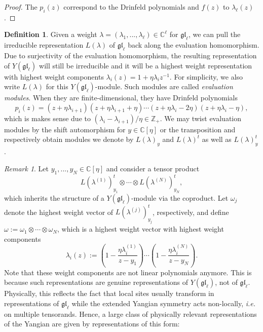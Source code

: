 \documentclass[11pt]{report}
\theoremstyle{definition}
\newtheorem{definition}[theorem]{Definition}
\theoremstyle{remark}
\newtheorem*{remark}{Remark}
\theoremstyle{remark}
\newcommand{\Z}{\mathbb{Z}}
\newcommand{\C}{\mathbb{C}}
\begin{document}
\begin{proof}
The $p_i(z)$ correspond to the Drinfeld polynomials and $f(z)$ to $\lambda_\ell(z)$.
\end{proof}

\begin{definition}
Given a weight $\lambda = (\lambda_1,...,\lambda_\ell) \in \C^\ell$ for $\mathfrak{gl}_\ell$, we can pull the irreducible representation $L(\lambda)$ of $\mathfrak{gl}_\ell$ back along the evaluation homomorphism. Due to surjectivity of the evaluation homomorphism, the resulting representation of $Y(\mathfrak{gl}_\ell)$ will still be irreducible and it will be a highest weight representation with highest weight components $\lambda_i(z) = 1 + \eta \lambda_i z^{-1}$. For simplicity, we also write $L(\lambda)$ for this $Y(\mathfrak{gl}_\ell)$-module. Such modules are called \emph{evaluation modules}. When they are finite-dimensional, they have Drinfeld polynomials
\begin{equation*}
p_i(z) = (z+\eta \lambda_{i+1})(z+\eta \lambda_{i+1}+\eta) \cdots (z+\eta \lambda_i-2\eta)(z+\eta \lambda_i-\eta),
\end{equation*}
which is makes sense due to $(\lambda_i - \lambda_{i+1})/\eta \in \Z_+$. We may twist evaluation modules by the shift automorphism for $y \in \C[\eta]$ or the transposition and respectively obtain modules we denote by $L(\lambda)_y$ and $L(\lambda)^t$ as well as $L(\lambda)_y^t$.
\end{definition}

\begin{remark}
Let $y_1,...,y_N \in \C[\eta]$ and consider a tensor product
\begin{equation*}
L(\lambda^{(1)})_{y_1}^t \otimes \cdots \otimes L(\lambda^{(N)})_{y_N}^t,
\end{equation*}
which inherits the structure of a $Y(\mathfrak{gl}_\ell)$-module via the coproduct. Let $\omega_j$ denote the highest weight vector of $L(\lambda^{(j)})_{y_j}^t$, respectively, and define $\omega := \omega_1 \otimes \cdots \otimes \omega_N$, which is a highest weight vector with highest weight components
\begin{equation*}
\lambda_i(z) := \left( 1 - \frac{\eta \lambda_i^{(1)}}{z-y_1} \right) \cdots \left( 1 - \frac{\eta \lambda_i^{(N)}}{z-y_N} \right).
\end{equation*}
Note that these weight components are not linear polynomials anymore. This is because such representations are genuine representations of $Y(\mathfrak{gl}_\ell)$, not of $\mathfrak{gl}_\ell$. Physically, this reflects the fact that local sites usually transform in representations of $\mathfrak{gl}_\ell$ while the extended Yangian symmetry acts non-locally, \emph{i.e.} on multiple tensorands. Hence, a large class of physically relevant representations of the Yangian are given by representations of this form:
\end{remark}
\end{document}
